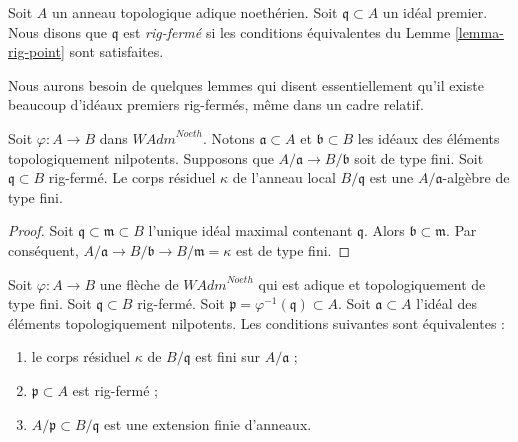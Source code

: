 \begin{definition}
\label{definition-rig-closed}
Soit $A$ un anneau topologique adique noethérien. Soit
$\mathfrak q \subset A$ un idéal premier. Nous disons que
$\mathfrak q$ est {\it rig-fermé} si les conditions équivalentes
du Lemme \ref{lemma-rig-point} sont satisfaites.
\end{definition}

\noindent
Nous aurons besoin de quelques lemmes qui disent essentiellement qu'il existe
beaucoup d'idéaux premiers rig-fermés, même dans un cadre relatif.

\begin{lemma}
\label{lemma-rig-closed-point-relative-residue-field}
Soit $\varphi : A \to B$ dans $\textit{WAdm}^{Noeth}$.
Notons $\mathfrak a \subset A$ et $\mathfrak b \subset B$
les idéaux des éléments topologiquement nilpotents. Supposons que
$A/\mathfrak a \to B/\mathfrak b$ soit de type fini.
Soit $\mathfrak q \subset B$ rig-fermé.
Le corps résiduel $\kappa$ de l'anneau local $B/\mathfrak q$
est une $A/\mathfrak a$-algèbre de type fini.
\end{lemma}

\begin{proof}
Soit $\mathfrak q \subset \mathfrak m \subset B$ l'unique
idéal maximal contenant $\mathfrak q$.
Alors $\mathfrak b \subset \mathfrak m$. Par conséquent,
$A/\mathfrak a \to B/\mathfrak b \to B/\mathfrak m = \kappa$ est
de type fini.
\end{proof}

\begin{lemma}
\label{lemma-rig-closed-point-relative}
Soit $\varphi : A \to B$ une flèche de $\textit{WAdm}^{Noeth}$
qui est adique et topologiquement de type fini.
Soit $\mathfrak q \subset B$ rig-fermé.
Soit $\mathfrak p = \varphi^{-1}(\mathfrak q) \subset A$.
Soit $\mathfrak a \subset A$ l'idéal des éléments topologiquement
nilpotents. Les conditions suivantes sont équivalentes :
\begin{enumerate}
\item le corps résiduel $\kappa$ de $B/\mathfrak q$ est fini
sur $A/\mathfrak a$ ;
\item $\mathfrak p \subset A$ est rig-fermé ;
\item $A/\mathfrak p \subset B/\mathfrak q$ est une extension finie
d'anneaux.
\end{enumerate}
\end{lemma}

